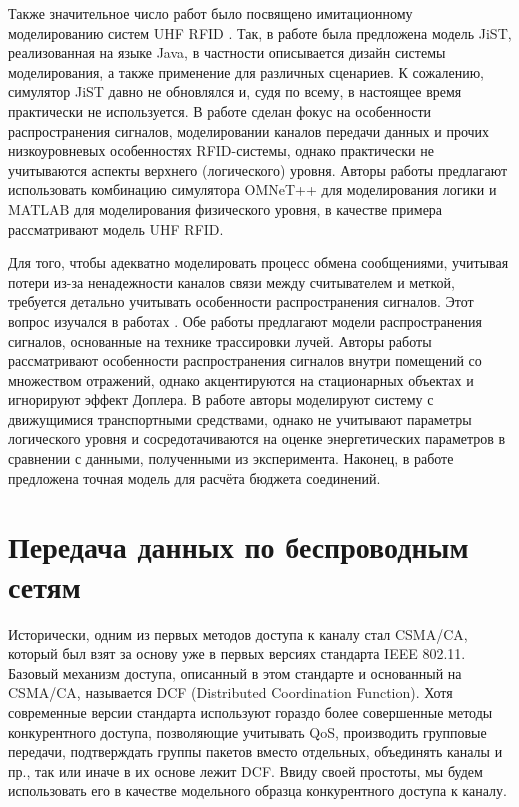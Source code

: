 Также значительное число работ было посвящено имитационному моделированию систем UHF RFID \cite{Floerkemeier09, Arnitz2009, Zhang2010}. Так, в работе \cite{Floerkemeier09} была предложена модель JiST, реализованная на языке Java, в частности описывается дизайн системы моделирования, а также применение для различных сценариев. К сожалению, симулятор JiST давно не обновлялся и, судя по всему, в настоящее время практически не используется. В работе \cite{Arnitz2009} сделан фокус на особенности распространения сигналов, моделировании каналов передачи данных и прочих низкоуровневых особенностях RFID-системы, однако практически не учитываются аспекты верхнего (логического) уровня. Авторы работы \cite{Zhang2010} предлагают использовать комбинацию симулятора OMNeT++ для моделирования логики и MATLAB для моделирования физического уровня, в качестве примера рассматривают модель UHF RFID.

Для того, чтобы адекватно моделировать процесс обмена сообщениями, учитывая потери из-за ненадежности каналов связи между считывателем и меткой, требуется детально учитывать особенности распространения сигналов. Этот вопрос изучался в работах \cite{Dimitriou14, Azpilicueta16}. Обе работы предлагают модели распространения сигналов, основанные на технике трассировки лучей. Авторы работы \cite{Dimitriou14} рассматривают особенности распространения сигналов внутри помещений со множеством отражений, однако акцентируются на стационарных объектах и игнорируют эффект Доплера. В работе \cite{Azpilicueta16} авторы моделируют систему с движущимися транспортными средствами, однако не учитывают параметры логического уровня и сосредотачиваются на оценке энергетических параметров в сравнении с данными, полученными из эксперимента. Наконец, в работе \cite{Griffin09} предложена точная модель для расчёта бюджета соединений.








\section{Передача данных по беспроводным сетям}

Исторически, одним из первых методов доступа к каналу стал CSMA/CA, который был взят за основу уже в первых версиях стандарта IEEE 802.11. Базовый механизм доступа, описанный в этом стандарте и основанный на CSMA/CA, называется DCF (Distributed Coordination Function). Хотя современные версии стандарта используют гораздо более совершенные методы конкурентного доступа, позволяющие учитывать QoS, производить групповые передачи, подтверждать группы пакетов вместо отдельных, объединять каналы и пр., так или иначе в их основе лежит DCF. Ввиду своей простоты, мы будем использовать его в качестве модельного образца конкурентного доступа к каналу.

